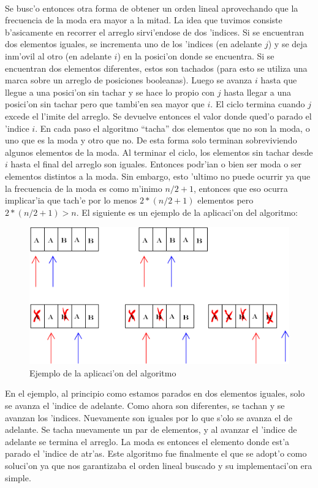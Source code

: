 \paragraph{}
Se busc'o entonces otra forma de  obtener un orden lineal aprovechando que la frecuencia de la moda 
era mayor a la mitad. La idea que tuvimos consiste b'asicamente en recorrer el arreglo sirvi'endose de 
dos 'indices. Si se encuentran dos elementos iguales, se incrementa uno de los 'indices (en adelante $j$) 
y se deja inm'ovil al otro (en adelante $i$) en la posici'on donde se encuentra. Si se encuentran dos 
elementos diferentes, estos son tachados (para esto se utiliza una marca sobre un arreglo de posiciones booleanas). 
Luego se avanza $i$ hasta que llegue a una posici'on sin tachar y se hace lo propio con $j$ hasta llegar 
a una posici'on sin tachar pero que tambi'en sea mayor que $i$. El ciclo termina cuando $j$ excede el l'imite 
del arreglo. Se devuelve entonces el valor donde qued'o parado el 'indice $i$. 
En cada paso el algoritmo ``tacha'' dos elementos que no son la moda, o uno que es la moda y otro que no. 
De esta forma solo terminan sobreviviendo algunos elementos de la moda. Al terminar el ciclo, los elementos
sin tachar desde $i$ hasta el final del arreglo son iguales. Entonces podr'ian o bien ser moda o ser elementos 
distintos a la moda. Sin embargo, esto 'ultimo no puede ocurrir ya que la frecuencia de la moda es como m'inimo 
$n/2+1$, entonces que eso ocurra implicar'ia que tach'e por lo menos $2*(n/2+1)$ elementos pero $2*(n/2+1) > n$.
El siguiente es un ejemplo de la aplicaci'on del algoritmo:
\begin{figure}[H]
\centering
\includegraphics[scale=0.7]{./ejemplo.png}
\caption{Ejemplo de la aplicaci'on del algoritmo}
\end{figure}
En el ejemplo, al principio como estamos parados en dos elementos iguales, solo se avanza el 'indice de adelante. 
Como ahora son diferentes, se tachan y se avanzan los 'indices. Nuevamente son iguales por lo que s'olo 
se avanza el de adelante. Se tacha nuevamente un par de elementos, y al avanzar el 'indice de adelante se 
termina el arreglo. La moda es entonces el elemento donde est'a parado el 'indice de atr'as.
Este algoritmo fue finalmente el que se adopt'o como soluci'on ya que nos garantizaba el orden lineal 
buscado y su implementaci'on era simple.

